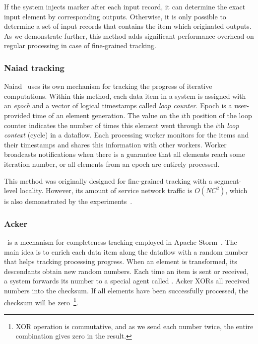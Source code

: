 If the system injects marker after each input record, it can determine the exact input element by corresponding outputs. Otherwise, it is only possible to determine a set of input records that contains the item which originated outputs. As we demonstrate further, this method adds significant performance overhead on regular processing in case of fine-grained tracking.

\subsubsection{Naiad tracking}

Naiad~\cite{Murray:2013:NTD:2517349.2522738} uses its own mechanism for tracking the progress of iterative computations. Within this method, each data item in a system is assigned with an {\em epoch} and a vector of logical timestamps called {\em loop counter}. Epoch is a user-provided time of an element generation. The value on the $i$th position of the loop counter indicates the number of times this element went through the $i$th {\em loop context} (cycle) in a dataflow. Each processing worker monitors for the items and their timestamps and shares this information with other workers. Worker broadcasts notifications when there is a guarantee that all elements reach some iteration number, or all elements from an epoch are entirely processed.

This method was originally designed for fine-grained tracking with a segment-level locality. However, its amount of service network traffic is $O(NC^2)$, which is also demonstrated by the experiments~\cite{Murray:2013:NTD:2517349.2522738}.



\subsubsection{Acker}

\acker\ is a mechanism for completeness tracking employed in Apache Storm~\cite{apache:storm}. The main idea is to enrich each data item along the dataflow with a random number that helps tracking processing progress. When an element is transformed, its descendants obtain new random numbers. Each time an item is sent or received, a system forwards its number to a special agent called {\em \acker}. Acker XORs all received numbers into the checksum. If all elements have been successfully processed, the checksum will be zero~\footnote{XOR operation is commutative, and as we send each number twice, the entire combination gives zero in the result.}.

